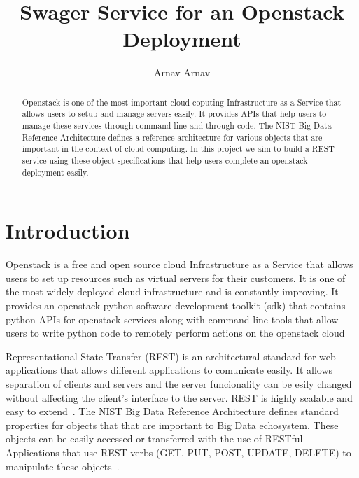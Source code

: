 
\title{Swager Service for an Openstack Deployment}


\author{Arnav Arnav}


\renewcommand{\shortauthors}{Arnav}


\begin{abstract}
Openstack is one of the most important cloud coputing Infrastructure
as a Service that allows users to setup and manage servers easily. It
provides APIs that help users to manage these services through
command-line and through code. The NIST Big Data Reference 
Architecture defines a reference architecture for various objects that
are important in the context of cloud computing. In this project we
aim to build a REST service using these object specifications that
help users complete an openstack deployment easily.
\end{abstract}



\maketitle

\section{Introduction}
Openstack is a free and open source cloud Infrastructure as a Service
that allows users to set up resources such as virtual servers for
their customers. It is one of the most widely deployed cloud
infrastructure and is constantly improving. It provides an openstack
python software development toolkit (sdk) that contains python APIs
for openstack services along with command line tools that allow users
to write python code to remotely perform actions on the openstack
cloud

Representational State Transfer (REST) is an architectural standard
for web applications that allows different applications to comunicate
easily. It allows separation of clients and servers and the server
funcionality can be esily changed without affecting the client's
interface to the server. REST is highly scalable and easy to
extend~\cite{hid-sp18-503-REST}. The NIST Big Data Reference
Architecture defines standard properties for objects that that are
important to Big Data echosystem.
These objects can be easily accessed or transferred with the use of
RESTful Applications that use REST verbs (GET, PUT, POST, UPDATE,
DELETE) to manipulate these objects~\cite{hid-sp18-503-REST}.

